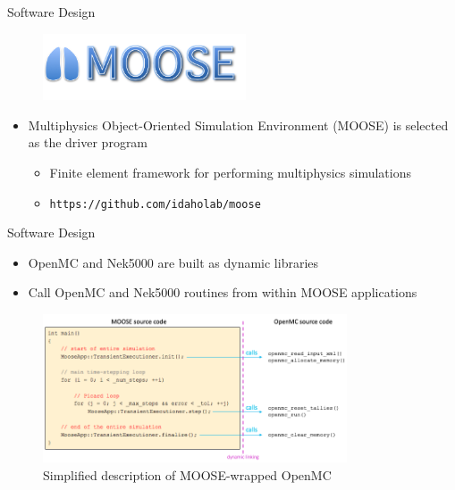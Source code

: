 \documentclass[10pt]{beamer}
\begin{document}
\begin{frame}{Software Design}
\begin{figure}
\includegraphics[width=6cm]{../Figures/Moose_Multiphysics.png}
\end{figure}
\begin{itemize}
\item Multiphysics Object-Oriented Simulation Environment (MOOSE) is selected as the driver program
	\begin{itemize}
	\item Finite element framework for performing multiphysics simulations
	\item {\tt https://github.com/idaholab/moose}
	\end{itemize}
\end{itemize}
\end{frame}

\begin{frame}{Software Design}
\begin{itemize}
\item OpenMC and Nek5000 are built as dynamic libraries
\item Call OpenMC and Nek5000 routines from within MOOSE applications
\end{itemize}
\begin{figure}
\includegraphics[width=9cm]{../Figures/moose_driver.png}
\caption{Simplified description of MOOSE-wrapped OpenMC}
\end{figure}
\end{frame}
\end{document}
